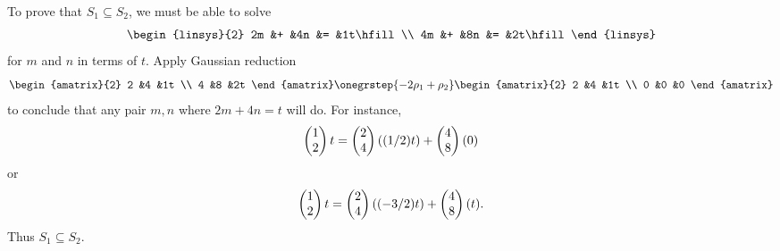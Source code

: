 \begin{exercises}
\begin{answer}
\begin{exparts}
        To prove that \( S_1\subseteq S_2 \), we must be able to solve
        \begin{equation*}
          \begin{linsys}{2}
           2m  &+  &4n  &=  &1t\hfill  \\
           4m  &+  &8n  &=  &2t\hfill  
          \end{linsys}
        \end{equation*}
        for \( m \) and \( n \) in terms of \( t \).
        Apply Gaussian  reduction
        \begin{equation*}
          \begin{amatrix}{2}
            2  &4   &1t  \\
            4  &8   &2t
          \end{amatrix}
          \onegrstep{-2\rho_1+\rho_2}
          \begin{amatrix}{2}
            2  &4   &1t  \\
            0  &0   &0
          \end{amatrix}
        \end{equation*}
        to conclude that
        any pair \( m,n \) where \( 2m+4n=t \) will do.
        For instance,
        \begin{equation*}
          \begin{pmatrix} 1 \\ 2 \end{pmatrix}t
          =\begin{pmatrix} 2 \\ 4 \end{pmatrix}((1/2)t)
          +\begin{pmatrix} 4 \\ 8 \end{pmatrix}(0)
        \end{equation*}
        or
        \begin{equation*}
          \begin{pmatrix} 1 \\ 2 \end{pmatrix}t
          =\begin{pmatrix} 2 \\ 4 \end{pmatrix}((-3/2)t)
          +\begin{pmatrix} 4 \\ 8 \end{pmatrix}(t).
        \end{equation*}
        Thus \( S_1\subseteq S_2 \).


\end{exparts}
\end{answer}
\end{exercises}
